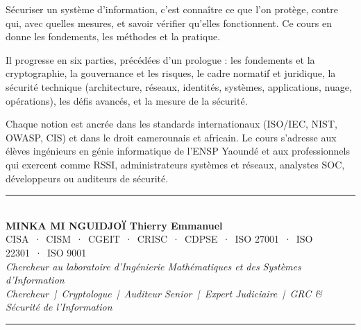 \documentclass[12pt, twoside, openright, a4paper]{book}
\begin{document}
\begin{center}
\begin{minipage}{0.75\textwidth}
\color{white!85!gray}
Sécuriser un système d'information, c'est connaître ce que l'on protège,
contre qui, avec quelles mesures, et savoir vérifier qu'elles fonctionnent.
Ce cours en donne les fondements, les méthodes et la pratique.

\medskip

Il progresse en six parties, précédées d'un prologue : les fondements et la
cryptographie, la gouvernance et les risques, le cadre normatif et
juridique, la sécurité technique (architecture, réseaux, identités,
systèmes, applications, nuage, opérations), les défis avancés, et la mesure
de la sécurité.

\medskip

Chaque notion est ancrée dans les standards internationaux (ISO/IEC, NIST,
OWASP, CIS) et dans le droit camerounais et africain. Le cours s'adresse aux
élèves ingénieurs en génie informatique de l'ENSP Yaoundé et aux
professionnels qui exercent comme RSSI, administrateurs systèmes et réseaux,
analystes SOC, développeurs ou auditeurs de sécurité.
\end{minipage}
\end{center}

\vfill

\begin{center}
    {\color{CouleurAccent}\rule{0.7\linewidth}{1.2pt}}\\[1.2ex]
    {\color{white}\large\bfseries MINKA MI NGUIDJOÏ Thierry Emmanuel}\\[0.4ex]
    {\color{white!80!gray}\small
        CISA~·~CISM~·~CGEIT~·~CRISC~·~CDPSE~·~ISO 27001~·~ISO 22301~·~ISO 9001}\\[0.3ex]
    {\color{white!70!gray}\footnotesize\itshape
        Chercheur au laboratoire d'Ingénierie Mathématiques et des Systèmes d'Information}\\[0.3ex]
    {\color{white!70!gray}\footnotesize\itshape
        Chercheur~|~Cryptologue~|~Auditeur Senior~|~Expert Judiciaire~|~GRC \& Sécurité de l'Information}\\[1.2ex]
    {\color{CouleurAccent}\rule{0.7\linewidth}{1.2pt}}
\end{center}

\vspace{1cm}

\afterpage{\nopagecolor}
\end{document}
